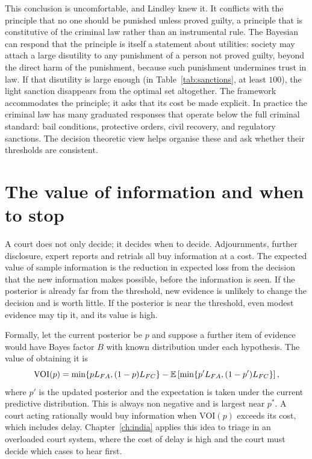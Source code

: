 This conclusion is uncomfortable, and Lindley knew it. It conflicts with the principle that no one should be punished unless proved guilty, a principle that is constitutive of the criminal law rather than an instrumental rule. The Bayesian can respond that the principle is itself a statement about utilities: society may attach a large disutility to any punishment of a person not proved guilty, beyond the direct harm of the punishment, because such punishment undermines trust in law. If that disutility is large enough (in Table~\ref{tab:sanctions}, at least $100$), the light sanction disappears from the optimal set altogether. The framework accommodates the principle; it asks that its cost be made explicit. In practice the criminal law has many graduated responses that operate below the full criminal standard: bail conditions, protective orders, civil recovery, and regulatory sanctions. The decision theoretic view helps organise these and ask whether their thresholds are consistent.

\section{The value of information and when to stop}

A court does not only decide; it decides when to decide. Adjournments, further disclosure, expert reports and retrials all buy information at a cost. The expected value of sample information is the reduction in expected loss from the decision that the new information makes possible, before the information is seen. If the posterior is already far from the threshold, new evidence is unlikely to change the decision and is worth little. If the posterior is near the threshold, even modest evidence may tip it, and its value is high.

Formally, let the current posterior be $p$ and suppose a further item of evidence would have Bayes factor $B$ with known distribution under each hypothesis. The value of obtaining it is
\begin{equation}
\mathrm{VOI}(p) = \min\{p L_{FA}, (1-p)L_{FC}\} - \mathbb{E}\left[\min\{p' L_{FA}, (1-p') L_{FC}\}\right],
\end{equation}
where $p'$ is the updated posterior and the expectation is taken under the current predictive distribution. This is always non negative and is largest near $p^\ast$. A court acting rationally would buy information when $\mathrm{VOI}(p)$ exceeds its cost, which includes delay. Chapter~\ref{ch:india} applies this idea to triage in an overloaded court system, where the cost of delay is high and the court must decide which cases to hear first.

